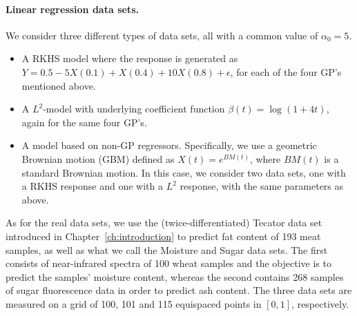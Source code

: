 \paragraph{Linear regression data sets.} We consider three different types of data sets, all with a common value of \(\alpha_0=5\).
\begin{itemize}
  \item A RKHS model where the response is generated as \(Y= 0.5 -5X(0.1) + X(0.4) + 10X(0.8) + \epsilon\), for each of the four GP's mentioned above.
  \item A \(L^2\)-model with underlying coefficient function \(\beta(t)=\log(1+4t)\), again for the same four GP's.
  \item A model based on non-GP regressors. Specifically, we use a geometric Brownian motion (GBM) defined as \(X(t)=e^{BM(t)}\), where \(BM(t)\) is a standard Brownian motion. In this case, we consider two data sets, one with a RKHS response and one with a \(L^2\) response, with the same parameters as above.
\end{itemize}
As for the real data sets, we use the (twice-differentiated) Tecator data set introduced in Chapter~\ref{ch:introduction} to predict fat content of 193 meat samples, as well as what we call the Moisture \citep{kalivas1997two} and Sugar \citep{bro1999exploratory} data sets. The first consists of near-infrared spectra of 100 wheat samples and the objective is to predict the samples' moisture content, whereas the second contains 268 samples of sugar fluorescence data in order to predict ash content. The three data sets are measured on a grid of 100, 101 and 115 equispaced points in \([0, 1]\), respectively.

